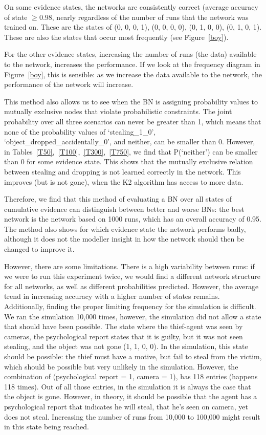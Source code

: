 \documentclass[12pt]{article}
\begin{document}
On some evidence states, the networks are consistently correct (average accuracy of state $\geq 0.98$, nearly regardless of the number of runs that the network was trained on. These are the states of (0, 0, 0, 1), (0, 0, 0, 0), (0, 1, 0, 0), (0, 1, 0, 1). These are also the states that occur most frequently (see Figure~\ref{boy}).

For the other evidence states, increasing the number of runs (the data) available to the network, increases the performance. If we look at the frequency diagram in Figure~\ref{boy}, this is sensible: as we increase the data available to the network, the performance of the network will increase.


This method also allows us to see when the BN is assigning probability values to mutually exclusive nodes that violate probabilistic constraints. The joint probability over all three scenarios can never be greater than 1, which means that none of the probability values of `stealing\_1\_0', `object\_dropped\_accidentally\_0', and neither, can be smaller than 0. However, in Tables~\ref{T50},~\ref{T100},~\ref{T300},~\ref{T750}, we find that P(`neither') can be smaller than 0 for some evidence state.  This shows that the mutually exclusive relation between stealing and dropping is not learned correctly in the network. This improves (but is not gone), when the K2 algorithm has access to more data.


Therefore, we find that this method of evaluating a BN over all states of cumulative evidence can distinguish between better and worse BNs: the best network is the network based on 1000 runs, which has an overall accuracy of 0.95. The method also shows for which evidence state the network performs badly, although it does not the modeller insight in how the network should then be changed to improve it. 

However, there are some limitations. There is a high variability between runs: if we were to run this experiment twice, we would find a different network structure for all networks, as well as different probabilities predicted. However, the average trend in increasing accuracy with a higher number of states remains. Additionally, finding the proper limiting frequency for the simulation is difficult. We ran the simulation 10,000 times, however, the simulation did not allow a state that should have been possible. The state where the thief-agent was seen by cameras, the psychological report states that it is guilty, but it was not seen stealing, and the object was not gone (1, 1, 0, 0). In the simulation, this state should be possible: the thief must have a motive, but fail to steal from the victim, which should be possible but very unlikely in the simulation. However, the combination of (psychological report = 1, camera = 1), has 118 entries (happens 118 times). Out of all those entries, in the simulation it is always the case that the object is gone. However, in theory, it should be possible that the agent has a psychological report that indicates he will steal, that he's seen on camera, yet does not steal. Increasing the number of runs from 10,000 to 100,000 might result in this state being reached.
\end{document}
